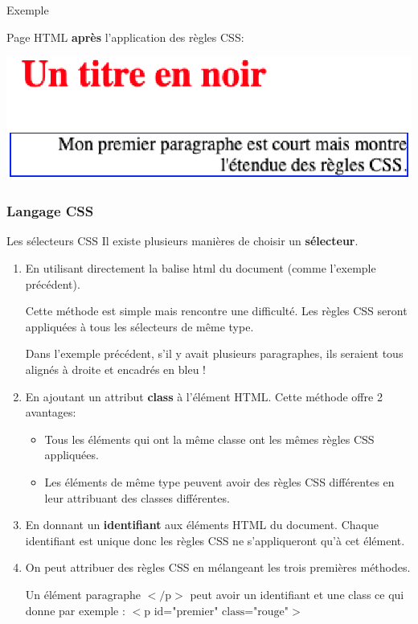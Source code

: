 \documentclass[8pt]{beamer}
\newcounter{num}
\begin{document}
\begin{frame}
\begin{exampleblock}{Exemple}
\begin{minipage}{0.42\textwidth}
Page HTML \textbf{après} l'application des règles CSS:\medskip

\includegraphics[scale=0.4]{img/exempleCSS2.eps}
\end{minipage}

\end{exampleblock}

\end{frame}


\begin{frame}
\frametitle{Langage CSS}

\begin{block}{Les sélecteurs CSS}
Il existe plusieurs manières de choisir un \textbf{sélecteur}.
\begin{enumerate}
\item En utilisant directement la balise html du document (comme l'exemple précédent).

Cette méthode est simple mais rencontre une difficulté. Les règles CSS seront appliquées à tous les sélecteurs de même type.

Dans l'exemple précédent, s'il y avait plusieurs paragraphes, ils seraient tous alignés à droite et encadrés en bleu !
\item En ajoutant un attribut \textbf{class} à l'élément HTML. Cette méthode offre 2 avantages:
\begin{itemize}
\item Tous les éléments qui ont la même classe ont les mêmes règles CSS appliquées.
\item Les éléments de même type peuvent avoir des règles CSS différentes en leur attribuant des classes différentes.
\end{itemize}
\item En donnant un \textbf{identifiant} aux éléments HTML du document. Chaque identifiant est unique donc les règles CSS ne s'appliqueront qu'à cet élément.
\item On peut attribuer des règles CSS en mélangeant les trois premières méthodes.

Un élément paragraphe $</\text{p}>$ peut avoir un identifiant et une class ce qui donne par exemple : $<\text{p id="premier" class="rouge"}>$
\end{enumerate}
\end{block}
\end{frame}
\end{document}
